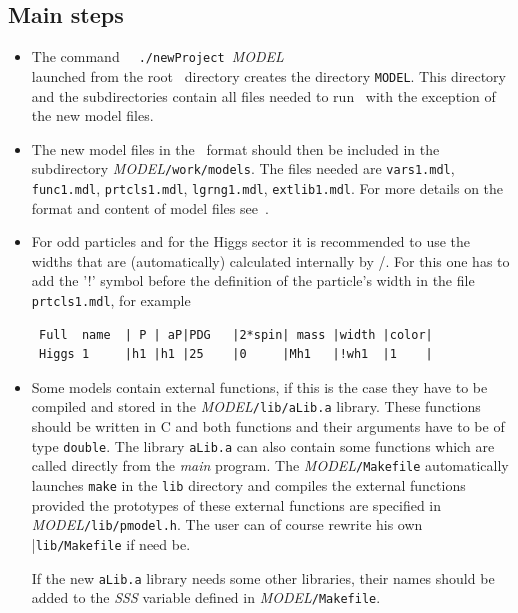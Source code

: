 \documentclass[12pt,a4paper]{article}
\begin{document}
\subsection{Main steps}
\begin{itemize}
\item
The command
\verb|  ./newProject |{\it MODEL}\\
launched from the root \micro\ directory  creates the directory 
\verb|MODEL|. This directory and the subdirectories contain all files needed to run \micro\ with the
exception of the new model files. 

\item
The new model files in the \calchep\ format should then be included in the
 subdirectory {\it MODEL}\verb|/work/models|.  The files needed are
\verb|vars1.mdl|,  \verb|func1.mdl|,  \verb|prtcls1.mdl|, \verb|lgrng1.mdl|,
\verb|extlib1.mdl|. For more details on the format and content of model files see~\cite{Pukhov:2004ca}.

\item
For odd particles and for the Higgs sector it is recommended to use the widths that are (automatically) calculated internally by 
\calchep/\micro. 
For this  one has to add the '!' symbol before  
the definition of the particle's width  in  the file \verb|prtcls1.mdl|, for example
\begin{verbatim}
 Full  name  | P | aP|PDG   |2*spin| mass |width |color|  
 Higgs 1     |h1 |h1 |25    |0     |Mh1   |!wh1  |1    |
\end{verbatim}


\item
Some models contain  external functions, if this is the case  they have to be 
compiled and stored in the {\it MODEL}\verb|/lib/aLib.a| library. 
These functions should be written in C and both functions and their arguments have to be 
of type \verb|double|. The library \verb|aLib.a| 
can also contain some functions which are called directly from the 
{\it main} program. The {\it MODEL}\verb|/Makefile| automatically launches
\verb|make| in the \verb|lib| directory and compiles the external functions provided
the prototypes of these external 
functions are specified in  {\it MODEL}\verb|/lib/pmodel.h|. 
The user can of course rewrite 
his own  |\verb|lib/Makefile| if need be.

If the new \verb|aLib.a| library needs some other libraries, their
names should be added to the {\it SSS} variable defined in {\it MODEL}\verb|/Makefile|.
\end{itemize}
\end{document}
